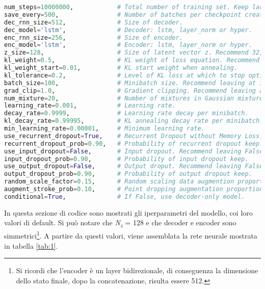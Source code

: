 \begin{minipage}{\linewidth}
\begin{lstlisting}[language = Python, frame = single, caption = {Iperparametri standard di sketch-rnn}, label = {iperparametri} captionpos = b]
num_steps=10000000,            # Total number of training set. Keep large.
save_every=500,                # Number of batches per checkpoint creation.
dec_rnn_size=512,              # Size of decoder.
dec_model='lstm',              # Decoder: lstm, layer_norm or hyper.
enc_rnn_size=256,              # Size of encoder.
enc_model='lstm',              # Encoder: lstm, layer_norm or hyper.
z_size=128,                    # Size of latent vector z. Recommend 32, 64 or 128.
kl_weight=0.5,                 # KL weight of loss equation. Recommend 0.5 or 1.0.
kl_weight_start=0.01,          # KL start weight when annealing.
kl_tolerance=0.2,              # Level of KL loss at which to stop optimizing for KL.
batch_size=100,                # Minibatch size. Recommend leaving at 100.
grad_clip=1.0,                 # Gradient clipping. Recommend leaving at 1.0.
num_mixture=20,                # Number of mixtures in Gaussian mixture model.
learning_rate=0.001,           # Learning rate.
decay_rate=0.9999,             # Learning rate decay per minibatch.
kl_decay_rate=0.99995,         # KL annealing decay rate per minibatch.
min_learning_rate=0.00001,     # Minimum learning rate.
use_recurrent_dropout=True,    # Recurrent Dropout without Memory Loss. Recomended.
recurrent_dropout_prob=0.90,   # Probability of recurrent dropout keep.
use_input_dropout=False,       # Input dropout. Recommend leaving False.
input_dropout_prob=0.90,       # Probability of input dropout keep.
use_output_dropout=False,      # Output droput. Recommend leaving False.
output_dropout_prob=0.90,      # Probability of output dropout keep.
random_scale_factor=0.15,      # Random scaling data augmention proportion.
augment_stroke_prob=0.10,      # Point dropping augmentation proportion.
conditional=True,              # If False, use decoder-only model.
\end{lstlisting}
\end{minipage}
In questa sezione di codice sono mostrati gli iperparametri del modello, coi loro valori di default. Si può notare che \textit{N\textsubscript{z}} = 128 e che decoder e encoder sono simmetrici\footnote{Si ricordi che l'encoder è un layer bidirezionale, di conseguenza la dimensione dello stato finale, dopo la concatenazione, risulta essere 512.}. A partire da questi valori, viene assemblata la rete neurale mostrata in tabella \ref{tab:1}.
